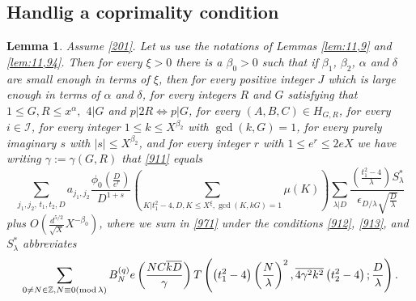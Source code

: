 \documentclass[12pt]{amsart}
\newtheorem{lemma}[theorem]{Lemma}
\theoremstyle{definition}
\numberwithin{equation}{section}
\begin{document}
\subsection{Handlig a coprimality condition}


\begin{lemma}\label{lem:11,941}Assume \eqref{201}. Let us
use the notations of Lemmas \ref{lem:11,9} and
\ref{lem:11,94}. Then for every
$\xi >0$ there is a $\beta_0>0$ such that if $\beta_1$, $\beta_2$, $
\alpha$ and $\delta$ are small
enough in terms of $\xi$, then for every positive integer $J$ which is large enough
in terms of $\alpha$ and $\delta$, for every integers $R$ and $G$ satisfying that
$1\le G,R\le x^{\alpha},$ $4|G$ and $p|2R\Leftrightarrow p|G$, for every
$\left(A,B,C\right)\in H_{G,R}$, for every $i\in\mathcal I$, for every
integer $1\le k\le X^{\beta_2}$ with $\gcd\left(k,G\right)=1$, for every purely
imaginary $s$ with $|s|\le X^{\beta_2}$, and for every integer $r$ with
$1\le e^r\le 2eX$ we have writing $\gamma :=\gamma\left(G,R\right
)$ that \eqref{911}
equals
\begin{equation}\sum_{j_1,j_2,\,t_1,t_2,D}a_{j_1,j_2}\frac {\phi_
0\left(\frac D{e^r}\right)}{D^{1+s}}\left(\sum_{K|t_1^2-4,D,K\le
X^{\xi},\gcd\left(K,kG\right)=1}\mu\left(K\right)\right)\sum_{\lambda
|D}\frac {\left(\frac {t_1^2-4}{\lambda}\right)S_{\lambda}^{\ast}}{
\epsilon_{D/\lambda}\sqrt {\frac D{\lambda}}}\label{971}\end{equation}
plus $O\left(\frac {d^{5/2}}{\sqrt {X}}X^{-\beta_0}\right)$, where we sum in \eqref{971} under the
conditions \eqref{912}, \eqref{913}, and $S_{\lambda}^{\ast}$ abbreviates
\[\sum_{0\neq N\in\mathbb{Z},N\equiv 0\left({\rm m}{\rm o}{\rm d}\,
\lambda\right)}B_N^{(q)}e\left(\frac {NC\overline {kD}}{\gamma}\right
)T\left(\left(t_1^2-4\right)\left(\frac N{\lambda}\right)^2,\overline {
4\gamma^2k^2}\left(t_2^2-4\right);\frac D{\lambda}\right).\]
\end{lemma}
\end{document}
